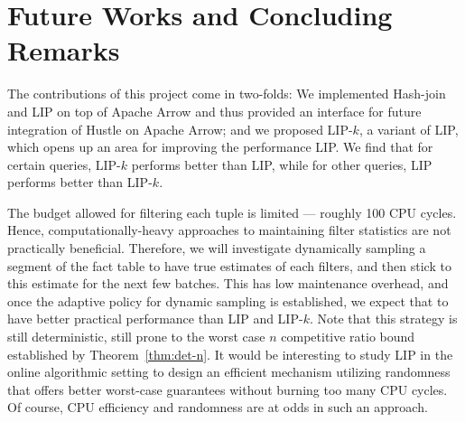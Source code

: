 \documentclass[10pt]{article}
\begin{document}
\newpage
\maketitle












\section{Future Works and Concluding Remarks}

The contributions of this project come in two-folds: We implemented Hash-join and LIP on top of Apache Arrow and thus provided an interface for future integration of Hustle on Apache Arrow; and we proposed LIP-$k$, a variant of LIP, which opens up an area for improving the performance LIP. 
We find that for certain queries, 
LIP-$k$ performs better than LIP, 
while for other queries,
LIP performs better than LIP-$k$.

The budget allowed for filtering each tuple is limited --- roughly 100 CPU cycles. Hence, computationally-heavy approaches to maintaining filter statistics are not practically beneficial. Therefore, we will investigate dynamically sampling a segment of the fact table to have true estimates of each filters, and then stick to this estimate for the next few batches. This has low maintenance overhead, and once the adaptive policy for dynamic sampling is established, we expect that to have better practical performance than LIP and LIP-$k$. Note that this strategy is still deterministic, still prone to the worst case $n$ competitive ratio bound established by Theorem~\ref{thm:det-n}.  
It would be interesting to study LIP in the online algorithmic setting to design an efficient mechanism utilizing randomness 
that offers better worst-case guarantees without burning too many CPU cycles.
Of course, CPU efficiency and randomness are at odds in such an approach. 
\end{document}
